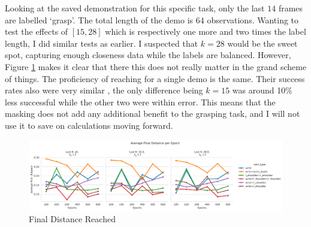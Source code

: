 Looking at the saved demonstration for this specific task, only the last $14$ frames are labelled `grasp'. The total length of the demo is $64$ observations. Wanting to test the effects of \(\left[15, 28\right]\) which is respectively one more and two times the label length, I did similar tests as earlier. I suspected that \(k = 28\) would be the sweet spot, capturing enough closeness data while the labels are balanced. However, Figure \ref{fig:grasp-last-k-final} makes it clear that there this does not really matter in the grand scheme of things. The proficiency of reaching for a single demo is the same. Their success rates also were very similar , the only difference being $k = 15$ was around 10\% less successful while the other two were within error. This means that the masking does not add any additional benefit to the grasping task, and I will not use it to save on calculations moving forward.

\begin{figure}[htpb]
  \centering
  \includegraphics[width=\linewidth]{assets/cam-comb/grasp-simple/last-k-dist.png}
  \caption{Final Distance Reached}\label{fig:grasp-last-k-final}
\end{figure}
